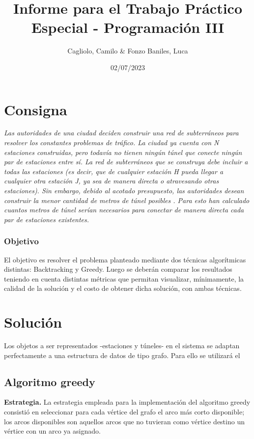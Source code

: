 \documentclass[10 pt, A4paper]{article}
\title{Informe para el Trabajo Práctico Especial - Programación III}
\author{Cagliolo, Camilo \& Fonzo Baniles, Luca}
\date{02/07/2023}
\begin{document}
	\pagestyle{fancy}
	\fancyhead{}
	\fancyhead[RE,LO]{\thepage}
	\fancyfoot{}
	
	\maketitle
	\section*{Consigna}
	\begin{displayquote}
		\textit{Las autoridades de una ciudad deciden construir una red de subterráneos para resolver los constantes problemas de tráfico. La ciudad ya cuenta con N estaciones construidas, pero todavía no tienen ningún túnel que conecte ningún par de estaciones entre sí. La red de subterráneos que se construya debe incluir a todas las estaciones (es decir, que de cualquier estación H pueda llegar a cualquier otra estación J, ya sea de manera directa o atravesando otras estaciones). Sin embargo, debido al acotado presupuesto, las autoridades desean construir la menor cantidad de metros de túnel posibles . Para esto han calculado cuantos metros de túnel serían necesarios para conectar de manera directa cada par de estaciones existentes.}
	\end{displayquote}
	\subsubsection*{Objetivo}
	El objetivo es resolver el problema planteado mediante dos técnicas algorítmicas distintas: Backtracking y Greedy. Luego se deberán comparar los resultados teniendo en cuenta distintas métricas que permitan visualizar, mínimamente, la calidad de la solución y el costo de obtener dicha solución, con ambas técnicas.
	\section*{Solución}
	
	Los objetos a ser representados -estaciones y túneles- en el sistema se adaptan perfectamente a una estructura de datos de tipo grafo. Para ello se utilizará el 
	
	\subsection*{Algoritmo greedy}
	
	\textbf{Estrategia.} La estrategia empleada para la implementación del algoritmo greedy consistió en seleccionar para cada vértice del grafo el arco más corto disponible; los arcos disponibles son aquellos arcos que no tuvieran como vértice destino un vértice con un arco ya asignado.
	
\end{document}
